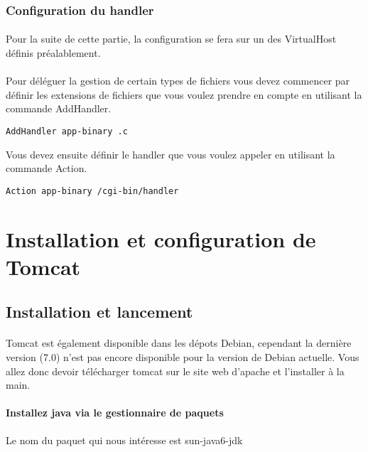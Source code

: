 \documentclass[12pt,a4paper]{article}
\begin{document}
\subsubsection{Configuration du handler}
\paragraph{}
Pour la suite de cette partie, la configuration se fera sur un des VirtualHost définis préalablement.

\paragraph{}
Pour déléguer la gestion de certain types de fichiers vous devez commencer par définir les extensions de fichiers que vous voulez prendre en compte en utilisant la commande AddHandler.

\begin{lstlisting}
AddHandler app-binary .c 
\end{lstlisting}

Vous devez ensuite définir le handler que vous voulez appeler en utilisant la commande Action.

\begin{lstlisting}
Action app-binary /cgi-bin/handler
\end{lstlisting}

\section{Installation et configuration de Tomcat}

\subsection{Installation et lancement}

\paragraph{}
Tomcat est également disponible dans les dépots Debian, cependant la dernière version (7.0) n'est pas encore disponible pour la version de Debian actuelle. Vous allez donc devoir télécharger tomcat sur le site web d'apache et l'installer à la main.

\paragraph{Installez java via le gestionnaire de paquets\\}
Le nom du paquet qui nous intéresse est sun-java6-jdk
\end{document}
